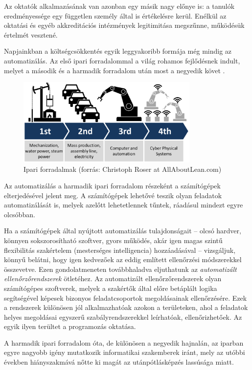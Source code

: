 Az oktatók alkalmazásának van azonban egy másik nagy előnye is: a tanulók eredményessége egy független személy által is értékelésre kerül.
Enélkül az oktatási és egyéb akkreditációs intézmények legitimitása megszűnne, működésük értelmét vesztené.

Napjainkban a költségcsökkentés egyik leggyakoribb formája még mindig az automatizálás.
Az első ipari forradalommal a világ rohamos fejlődésnek indult, melyet a második és a harmadik forradalom után most a negyedik követ \cite{FourthRevolution}.
\begin{figure}[h]
    \centering
    \includegraphics[width=0.8\textwidth]{figures/industrial_revolutions}
    \caption[Ipari forradalmak]{Ipari forradalmak (forrás: Christoph Roser at AllAboutLean.com)} %
\end{figure} 
Az automatizálás a harmadik ipari forradalom részeként a számítógépek elterjedésével jelent meg.
A számítógépek lehetővé teszik olyan feladatok automatizálását is, melyek azelőtt lehetetlennek tűntek, ráadásul mindezt egyre olcsóbban.

Ha a számítógépek által nyújtott automatizálás tulajdonságait -- olcsó hardver, könnyen sokszorosítható szoftver, gyors működés, akár igen magas szintű flexibilitás szakértelem (mesterséges intelligencia) hozzáadásával -- vizsgáljuk, könnyű belátni, hogy igen kedvezőek az eddig említett ellenőrzési módszerekkel összevetve.
Ezen gondolatmeneten továbbhaladva eljuthatunk az \textit{automatizált ellenőrzőrendszerek} ötletéhez.
Az automatizált ellenőrzőrendszerek olyan számítógépes szoftverek, melyek a szakértők által előre betáplált logika segítségével képesek bizonyos feladatcsoportok megoldásainak ellenőrzésére.
Ezek a rendszerek különösen jól alkalmazhatóak azokon a területeken, ahol a feladatok helyes megoldásai egyszerű szabályrendszerekkel leírhatóak, ellenőrizhetőek.
Az egyik ilyen terültet a programozás oktatása.

A harmadik ipari forradalom óta, de különösen a negyedik hajnalán, az iparban egyre nagyobb igény mutatkozik informatikai szakemberek iránt, mely az utóbbi években hiányszakmává nőtte ki magát az utánpótlásképzés lassúsága miatt.


